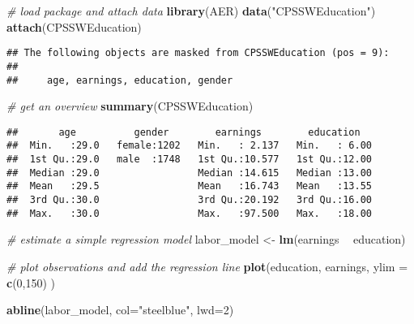 \documentclass[]{book}
\newenvironment{Shaded}{\begin{snugshade}}{\end{snugshade}}
\newcommand{\KeywordTok}[1]{\textcolor[rgb]{0.13,0.29,0.53}{\textbf{#1}}}
\newcommand{\DataTypeTok}[1]{\textcolor[rgb]{0.13,0.29,0.53}{#1}}
\newcommand{\DecValTok}[1]{\textcolor[rgb]{0.00,0.00,0.81}{#1}}
\newcommand{\StringTok}[1]{\textcolor[rgb]{0.31,0.60,0.02}{#1}}
\newcommand{\CommentTok}[1]{\textcolor[rgb]{0.56,0.35,0.01}{\textit{#1}}}
\newcommand{\OperatorTok}[1]{\textcolor[rgb]{0.81,0.36,0.00}{\textbf{#1}}}
\newcommand{\NormalTok}[1]{#1}
\theoremstyle{definition}
\theoremstyle{definition}
\theoremstyle{definition}
\theoremstyle{remark}
\begin{document}
\begin{Shaded}
\begin{Highlighting}[]
\CommentTok{# load package and attach data}
\KeywordTok{library}\NormalTok{(AER)}
\KeywordTok{data}\NormalTok{(}\StringTok{"CPSSWEducation"}\NormalTok{)}
\KeywordTok{attach}\NormalTok{(CPSSWEducation)}
\end{Highlighting}
\end{Shaded}

\begin{verbatim}
## The following objects are masked from CPSSWEducation (pos = 9):
## 
##     age, earnings, education, gender
\end{verbatim}

\begin{Shaded}
\begin{Highlighting}[]
\CommentTok{# get an overview}
\KeywordTok{summary}\NormalTok{(CPSSWEducation)}
\end{Highlighting}
\end{Shaded}

\begin{verbatim}
##       age          gender        earnings        education    
##  Min.   :29.0   female:1202   Min.   : 2.137   Min.   : 6.00  
##  1st Qu.:29.0   male  :1748   1st Qu.:10.577   1st Qu.:12.00  
##  Median :29.0                 Median :14.615   Median :13.00  
##  Mean   :29.5                 Mean   :16.743   Mean   :13.55  
##  3rd Qu.:30.0                 3rd Qu.:20.192   3rd Qu.:16.00  
##  Max.   :30.0                 Max.   :97.500   Max.   :18.00
\end{verbatim}

\begin{Shaded}
\begin{Highlighting}[]
\CommentTok{# estimate a simple regression model}
\NormalTok{labor_model <-}\StringTok{ }\KeywordTok{lm}\NormalTok{(earnings }\OperatorTok{~}\StringTok{ }\NormalTok{education)}

\CommentTok{# plot observations and add the regression line}
\KeywordTok{plot}\NormalTok{(education, }
\NormalTok{     earnings, }
     \DataTypeTok{ylim =} \KeywordTok{c}\NormalTok{(}\DecValTok{0}\NormalTok{,}\DecValTok{150}\NormalTok{)}
\NormalTok{     )}

\KeywordTok{abline}\NormalTok{(labor_model, }\DataTypeTok{col=}\StringTok{"steelblue"}\NormalTok{, }\DataTypeTok{lwd=}\DecValTok{2}\NormalTok{)}
\end{Highlighting}
\end{Shaded}
\end{document}
